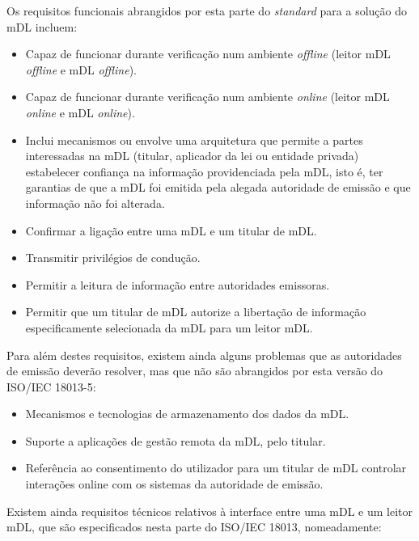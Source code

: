 
Os requisitos funcionais abrangidos por esta parte do \textit{standard} para a
solução do mDL incluem:

\begin{itemize}
	\item Capaz de funcionar durante verificação num ambiente \textit{offline} (leitor mDL \textit{offline} e mDL \textit{offline}).
	\item Capaz de funcionar durante verificação num ambiente \textit{online} (leitor mDL \textit{online} e mDL \textit{online}).
	\item Inclui mecanismos ou envolve uma arquitetura que permite a partes
	interessadas na mDL (titular, aplicador da lei ou entidade privada)
	estabelecer confiança na informação providenciada pela mDL, isto é, ter
	garantias de que a mDL foi emitida pela alegada autoridade de emissão e que
	informação não foi alterada.
	\item Confirmar a ligação entre uma mDL e um titular de mDL.
	\item Transmitir privilégios de condução.
	\item Permitir a leitura de informação entre autoridades emissoras.
	\item Permitir que um titular de mDL autorize a libertação de informação especificamente selecionada da mDL para um leitor mDL.
\end{itemize}

Para além destes requisitos, existem ainda alguns problemas que as autoridades
de emissão deverão resolver, mas que não são abrangidos por esta versão do
ISO/IEC 18013-5:

\begin{itemize}
	\item Mecanismos e tecnologias de armazenamento dos dados da mDL.
	\item Suporte a aplicações de gestão remota da mDL, pelo titular.
	\item Referência ao consentimento do utilizador para um titular de mDL controlar interações online com os sistemas da autoridade de emissão.
\end{itemize}

Existem ainda requisitos técnicos relativos à interface entre uma mDL e um
leitor mDL, que são especificados nesta parte do ISO/IEC 18013, nomeadamente:


